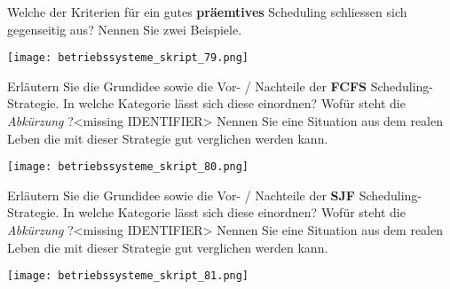 \documentclass{article}
\begin{document}
\begin{tcolorbox}[colback=white!10!white,colframe=lightgray!75!black,
  savelowerto=\jobname_ex.tex,breakable,enhanced,lines before break=40]

\begin{center}
Welche der Kriterien für ein gutes 
\textbf{präemtives
} Scheduling schliessen sich gegenseitig aus? Nennen Sie zwei Beispiele.

\end{center}

\tcblower

\justifying
\begin{center}
\texttt{[image: betriebssysteme\_skript\_79.png]}
\end{center}

\end{tcolorbox}
\begin{tcolorbox}[colback=white!10!white,colframe=lightgray!75!black,
  savelowerto=\jobname_ex.tex,breakable,enhanced,lines before break=40]

\begin{center}
Erläutern Sie die Grundidee sowie die Vor- / Nachteile der 
\textbf{FCFS
} Scheduling-Strategie. In welche Kategorie lässt sich diese einordnen? Wofür steht die 
\textit{Abkürzung
}?<missing IDENTIFIER>
Nennen Sie eine Situation aus dem realen Leben die mit dieser Strategie gut verglichen werden kann.

\end{center}

\tcblower

\justifying
\begin{center}
\texttt{[image: betriebssysteme\_skript\_80.png]}
\end{center}

\end{tcolorbox}
\begin{tcolorbox}[colback=white!10!white,colframe=lightgray!75!black,
  savelowerto=\jobname_ex.tex,breakable,enhanced,lines before break=40]

\begin{center}
Erläutern Sie die Grundidee sowie die Vor- / Nachteile der 
\textbf{SJF
} Scheduling-Strategie. In welche Kategorie lässt sich diese einordnen? Wofür steht die 
\textit{Abkürzung
}?<missing IDENTIFIER>
Nennen Sie eine Situation aus dem realen Leben die mit dieser Strategie gut verglichen werden kann.

\end{center}

\tcblower

\justifying
\begin{center}
\texttt{[image: betriebssysteme\_skript\_81.png]}
\end{center}

\end{tcolorbox}
\end{document}
